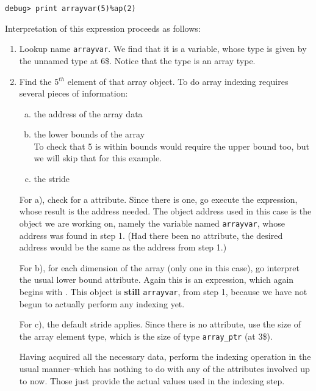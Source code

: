 \begin{lstlisting}[numbers=none]
debug> print arrayvar(5)%ap(2)
\end{lstlisting}

Interpretation of this expression proceeds as follows:
\begin{enumerate}[1. ]

\item Lookup name \texttt{arrayvar}. We find that it is a variable,
whose type is given by the unnamed type at 6\$. Notice that
the type is an array type.


\item Find the 5$^{th}$ element of that array object. To do array
indexing requires several pieces of information:
\begin{enumerate}[a) ]

\item  the address of the array data

\item the lower bounds of the array \\
\lbrack To check that 5 is within bounds would require the upper
bound too, but we will skip that for this example. \rbrack

\item the stride 

\end{enumerate}

For a), check for a 
\DWATdatalocation{} attribute. 
Since there is one, go execute the expression, whose result is
the address needed. The object address used in this case
is the object we are working on, namely the variable named
\texttt{arrayvar}, whose address was found in step 1. (Had there been
no \DWATdatalocation{} attribute, the desired address would
be the same as the address from step 1.)

For b), for each dimension of the array (only one
in this case), go interpret the usual lower bound
attribute. Again this is an expression, which again begins
with \DWOPpushobjectaddress. This object is 
\textbf{still} \texttt{arrayvar},
from step 1, because we have not begun to actually perform
any indexing yet.

For c), the default stride applies. Since there is no
\DWATbytestride{} attribute, use the size of the array element
type, which is the size of type \texttt{array\_ptr} (at 3\$).

\clearpage

Having acquired all the necessary data, perform the indexing
operation in the usual manner--which has nothing to do with
any of the attributes involved up to now. Those just provide
the actual values used in the indexing step.


\end{enumerate}
